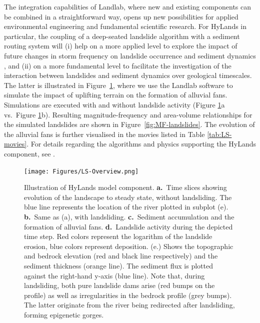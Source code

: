 \documentclass{article} %
\begin{document}
The integration capabilities of Landlab, where new and existing components can be combined in a straightforward way, opens up new possibilities for applied environmental engineering and fundamental scientific research. For HyLands in particular, the coupling of a deep-seated landslide algorithm with a sediment routing system will (i) help on a more applied level to explore the impact of future changes in storm frequency on landslide occurrence and sediment dynamics \citep{Fan2019}, and (ii) on a more fundamental level to facilitate the investigation of the interaction between landslides and sediment dynamics over geological timescales. The latter is illustrated in Figure~\ref{fig:landslides}, where we use the Landlab software to simulate the impact of uplifting terrain on the formation of alluvial fans. Simulations are executed with and without landslide activity (Figure \ref{fig:landslides}a vs.\ Figure \ref{fig:landslides}b). Resulting magnitude-frequency and area-volume relationships for the simulated landslides are shown in Figure~\ref{fig:MF-landslides}. The evolution of the alluvial fans is further visualised in the movies listed in Table \ref{tab:LS-movies}. For details regarding the algorithms and physics supporting the HyLands component, see \cite{campforts2020hylands}.

\begin{figure}
\texttt{[image: Figures/LS-Overview.png]}
\caption{Illustration of HyLands model component. \textbf{a.}\ Time slices showing evolution of the landscape to steady state, without landsliding. The blue line represents the location of the river plotted in subplot (e). \textbf{b.}\ Same as (a), with landsliding. \textbf{c.}\ Sediment accumulation and the formation of alluvial fans. \textbf{d.}\ Landslide activity during the depicted time step. Red colors represent the logarithm of the landslide erosion, blue colors represent deposition. (e.) Shows the topographic and bedrock elevation (red and black line respectively) and the sediment thickness (orange line). The sediment flux is plotted against the right-hand y-axis (blue line). Note that, during landsliding, both pure landslide dams arise (red bumps on the profile) as well as irregularities in the bedrock profile (grey bumps). The latter originate from the river being redirected after landsliding, forming epigenetic gorges.}
\label{fig:landslides}
\end{figure}
\end{document}
